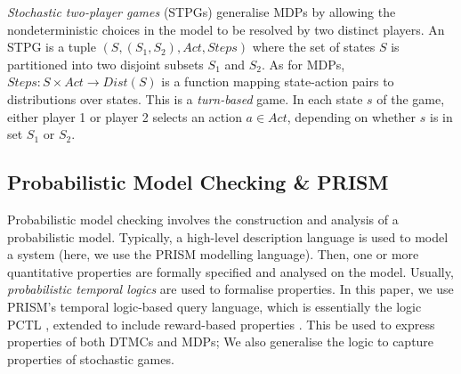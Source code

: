 \documentclass{llncs}
\begin{document}
\emph{Stochastic two-player games} (STPGs) generalise MDPs by allowing the nondeterministic choices
in the model to be resolved by two distinct players.
An STPG is a tuple $(S,(S_1,S_2),Act,Steps)$
where the set of states $S$ is partitioned into two disjoint subsets $S_1$ and $S_2$.
As for MDPs, $Steps:S\times Act\rightarrow Dist(S)$ is a function mapping
state-action pairs to distributions over states.
This is a \emph{turn-based} game. In each state $s$ of the game,
either player 1 or player 2 selects an action $a\in Act$,
depending on whether $s$ is in set $S_1$ or $S_2$.
\subsection{Probabilistic Model Checking \& PRISM}

Probabilistic model checking involves the construction and analysis of a probabilistic model.
Typically, a high-level description language is used to model a system
(here, we use the PRISM \cite{KNP11} modelling language).
Then, one or more quantitative properties are formally specified and analysed on the model.
Usually, \emph{probabilistic temporal logics} are used to formalise properties.
In this paper, we use PRISM's temporal logic-based query language,
which is essentially the logic PCTL \cite{HJ94},
extended to include reward-based properties \cite{KNP07a,FKNP11}.
This be used to express properties of both DTMCs and MDPs;
We also generalise the logic to capture properties of stochastic games.
\end{document}
